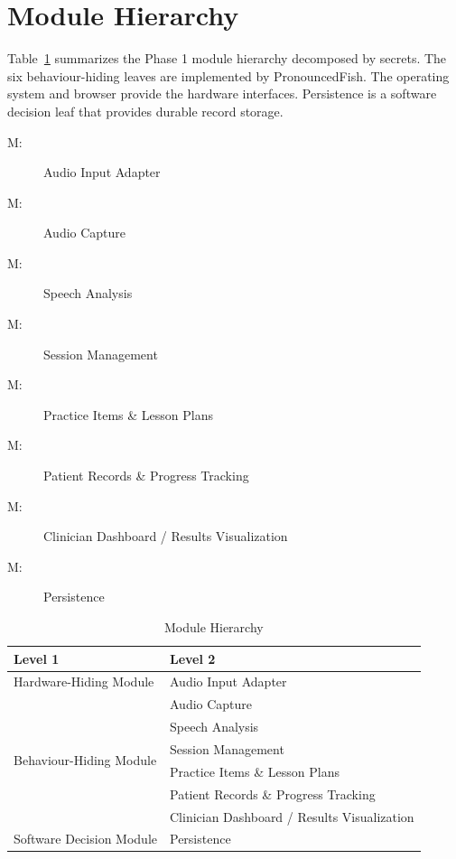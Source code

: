 \documentclass[12pt, titlepage]{article}
\newcounter{mnum}
\newcommand{\mthemnum}{M\themnum}
\begin{document}
\section{Module Hierarchy} \label{SecMH}

Table~\ref{TblMH} summarizes the Phase 1 module hierarchy decomposed by
secrets. The six behaviour-hiding leaves are implemented by PronouncedFish.
The operating system and browser provide the hardware interfaces.
Persistence is a software decision leaf that provides durable record storage.

\begin{description}
\item [ \mthemnum \label{mHH}:] Audio Input Adapter
\item [ \mthemnum \label{mAudioCapture}:] Audio Capture
\item [ \mthemnum \label{mSpeechAnalysis}:] Speech Analysis
\item [ \mthemnum \label{mSessionManagement}:] Session Management
\item [ \mthemnum \label{mPracticeItems}:] Practice Items \& Lesson Plans
\item [ \mthemnum \label{mPatientRecords}:] Patient Records \& Progress Tracking
\item [ \mthemnum \label{mClinicianDashboard}:] Clinician Dashboard / Results Visualization
\item [ \mthemnum \label{mPersistence}:] Persistence
\end{description}

\begin{table}[h!]
\centering
\begin{tabular}{p{} p{}}
\toprule
\textbf{Level 1} & \textbf{Level 2}\\
\midrule

{Hardware-Hiding Module} & Audio Input Adapter \\
\midrule

\multirow{6}{0.3\textwidth}{Behaviour-Hiding Module} & Audio Capture\\
& Speech Analysis\\
& Session Management\\
& Practice Items \& Lesson Plans\\
& Patient Records \& Progress Tracking\\
& Clinician Dashboard / Results Visualization\\
\midrule

{Software Decision Module} & Persistence\\
\bottomrule

\end{tabular}
\caption{Module Hierarchy}
\label{TblMH}
\end{table}
\end{document}
